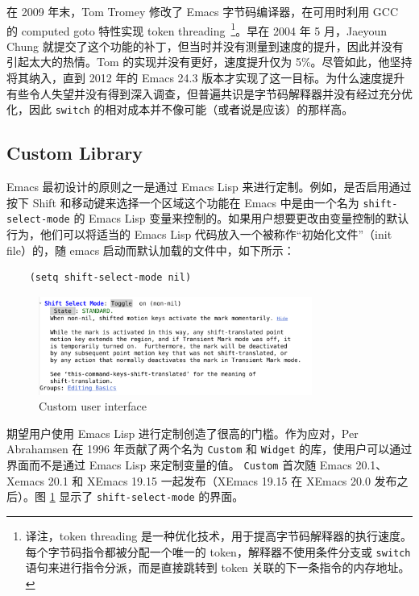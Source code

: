 \documentclass[format=acmsmall,screen]{acmart}
\begin{document}
在 2009 年末，Tom Tromey 修改了 Emacs 字节码编译器，在可用时利用 GCC 的 computed goto 特性实现 token threading~\cite{ComputedGOTO}\footnote{译注，token threading 是一种优化技术，用于提高字节码解释器的执行速度。每个字节码指令都被分配一个唯一的 token，解释器不使用条件分支或 \texttt{switch} 语句来进行指令分派，而是直接跳转到 token 关联的下一条指令的内存地址。}。早在 2004 年 5 月，Jaeyoun Chung 就提交了这个功能的补丁，但当时并没有测量到速度的提升，因此并没有引起太大的热情。Tom 的实现并没有更好，速度提升仅为 5\%。尽管如此，他坚持将其纳入，直到 2012 年的 Emacs 24.3 版本才实现了这一目标。为什么速度提升有些令人失望并没有得到深入调查，但普遍共识是字节码解释器并没有经过充分优化，因此 \texttt{switch} 的相对成本并不像可能（或者说是应该）的那样高。

\subsection{Custom Library}
\label{sec:custom}

Emacs 最初设计的原则之一是通过 Emacs Lisp 来进行定制。例如，是否启用通过按下 Shift 和移动键来选择一个区域这个功能在 Emacs 中是由一个名为 \texttt{shift-select-mode} 的 Emacs Lisp 变量来控制的。如果用户想要更改由变量控制的默认行为，他们可以将适当的 Emacs Lisp 代码放入一个被称作“初始化文件”（init file）的，随 emacs 启动而默认加载的文件中，如下所示：

%
\begin{verbatim}
    (setq shift-select-mode nil)
\end{verbatim}
%
\begin{figure}[tb]
  \centering
  \includegraphics[width=0.8\textwidth]{custom}
  \caption{Custom user interface}
  \label{fig:custom}
\end{figure}
%

期望用户使用 Emacs Lisp 进行定制创造了很高的门槛。作为应对，Per Abrahamsen 在 1996 年贡献了两个名为 \texttt{Custom} 和 \texttt{Widget} 的库，使用户可以通过界面而不是通过 Emacs Lisp 来定制变量的值。 \texttt{Custom} 首次随 Emacs 20.1、Xemacs 20.1 和 XEmacs 19.15 一起发布（XEmacs 19.15 在 XEmacs 20.0 发布之后）。图 \ref{fig:custom} 显示了 \texttt{shift-select-mode} 的界面。
\end{document}
